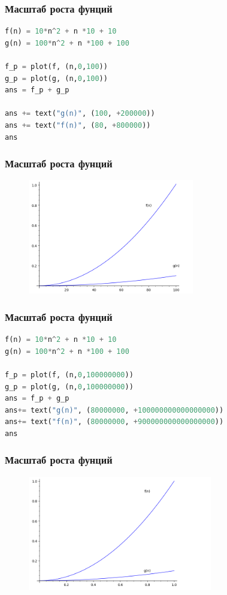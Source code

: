 \documentclass[russian, 12pt]{beamer}
\begin{document}
\begin{frame}[fragile]
\frametitle{Масштаб роста фунций}
\begin{lstlisting}[language=Python]
f(n) = 10*n^2 + n *10 + 10
g(n) = 100*n^2 + n *100 + 100

f_p = plot(f, (n,0,100))
g_p = plot(g, (n,0,100))
ans = f_p + g_p 

ans += text("g(n)", (100, +200000))
ans += text("f(n)", (80, +800000))
ans
\end{lstlisting}
\end{frame}
\begin{frame}[fragile]
\frametitle{Масштаб роста фунций}
\begin{figure}
\includegraphics[width=0.8\linewidth, height=5cm]{img/complexity_2.png}
\end{figure}
\end{frame}
\begin{frame}[fragile]
\frametitle{Масштаб роста фунций}
\begin{lstlisting}[language=Python]
f(n) = 10*n^2 + n *10 + 10
g(n) = 100*n^2 + n *100 + 100

f_p = plot(f, (n,0,100000000))
g_p = plot(g, (n,0,100000000))
ans = f_p + g_p 
ans+= text("g(n)", (80000000, +100000000000000000))
ans+= text("f(n)", (80000000, +900000000000000000))
ans
\end{lstlisting}
\end{frame}
\begin{frame}
\frametitle{Масштаб роста фунций}
\begin{figure}
\includegraphics[width=\linewidth, height=5cm]{img/complexity_3.png}
\end{figure}
\end{frame}
\end{document}
